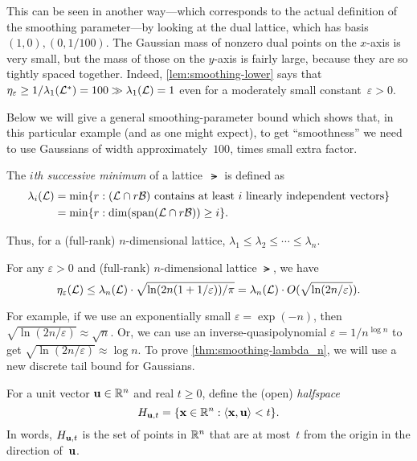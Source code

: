\documentclass[11pt]{article}
\begin{document}
This can be seen in another way---which corresponds to the actual
definition of the smoothing parameter---by looking at the dual
lattice, which has basis $(1,0), (0,1/100)$. The Gaussian mass of
nonzero dual points on the $x$-axis is very small, but the mass of
those on the $y$-axis is fairly large, because they are so tightly
spaced together. Indeed, \cref{lem:smoothing-lower} says that
$\eta_{\varepsilon} \geq 1/\lambda_{1}(\mathcal{L}^{*}) = 100 \gg
\lambda_{1}(\mathcal{L}) = 1$ even for a moderately small
constant~$\varepsilon > 0$.

Below we will give a general smoothing-parameter bound which shows
that, in this particular example (and as one might expect), to get
``smoothness'' we need to use Gaussians of width approximately~$100$,
times small extra factor.

\begin{definition}
  \label{def:successive-minimum}
  The \emph{$i$th successive minimum} of a
  lattice~$\lat$ is defined as
  \begin{align*}
    \lambda_i(\mathcal{L})
    &= \min \{r : (\mathcal{L} \cap r\mathcal{B}) \text{
      contains at least~$i$ linearly independent vectors}\} \\
    &= \min \{r : \dim(\operatorname{span}(\mathcal{L} \cap r\mathcal{B})) \geq i\} .
  \end{align*}
\end{definition}
Thus, for a (full-rank) $n$-dimensional lattice,
$\lambda_1 \leq \lambda_2 \leq \cdots \leq \lambda_n$.

\begin{theorem}
  \label{thm:smoothing-lambda_n}
  For any $\varepsilon > 0$ and (full-rank) $n$-dimensional lattice
  $\lat$, we have
  \[ \eta_\varepsilon(\mathcal{L}) \leq
    \lambda_n(\mathcal{L})\cdot\sqrt{\ln(2n(1+1/\varepsilon))/\pi}
    = \lambda_{n}(\mathcal{L}) \cdot O(\sqrt{\ln(2n/\varepsilon)}). \]
\end{theorem}

For example, if we use an exponentially small
$\varepsilon = \exp(-n)$, then
$\sqrt{\ln(2n/\varepsilon)} \approx \sqrt{n}$. Or, we can use an
inverse-quasipolynomial $\varepsilon = 1/n^{\log n}$ to get
$\sqrt{\ln(2n/\varepsilon)} \approx \log n$. To prove
\cref{thm:smoothing-lambda_n}, we will use a new discrete tail bound
for Gaussians.

\begin{definition}
  For a unit vector $\mathbf{u} \in \mathbb{R}^{n}$ and real $t \geq 0$, define the
  (open) \emph{halfspace}
  \[ H_{\mathbf{u},t} = \{\mathbf{x} \in \mathbb{R}^n : \langle\mathbf{x},\mathbf{u}\rangle < t\} . \]
  In words, $H_{\mathbf{u},t}$ is the set of points in $\mathbb{R}^{n}$ that are at
  most~$t$ from the origin in the direction of~$\mathbf{u}$.
\end{definition}
\end{document}
